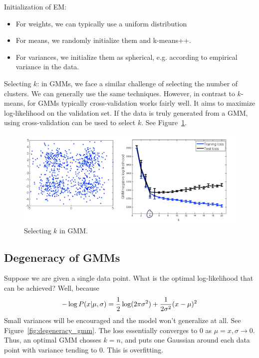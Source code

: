 \documentclass[a4paper,10pt,twoside]{article}
\begin{document}
Initialization of EM:
\begin{itemize}
\item For weights, we can typically use a uniform distribution
\item For means, we randomly initialize them and k-means++.
\item For variances, we initialize them as spherical, e.g. according to empirical variance in the data.
\end{itemize}

Selecting $k$: in GMMs, we face a similar challenge of selecting the number of clusters. We can generally use the same techniques. However, in contrast to $k$-means, for GMMs typically cross-validation works fairly well. It aims to maximize log-likelihood on the validation set. If the data is truly generated from a GMM, using cross-validation can be used to select $k$. See Figure~\ref{fig:selecting_k_gmm}.

\begin{figure}
  \centering
  \includegraphics[width=.8\textwidth]{figures/selecting_k_gmm.png}
  \caption{Selecting $k$ in GMM.}
  \label{fig:selecting_k_gmm}
\end{figure}

\subsection{Degeneracy of GMMs}

Suppose we are given a single data point. What is the optimal log-likelihood that can be achieved? Well, because
\begin{equation*}
  -\log P(x|\mu,\sigma)={1\over 2}\log(2\pi\sigma^2)+{1\over 2\sigma^2}(x-\mu)^2
\end{equation*}
Small variances will be encouraged and the model won't generalize at all. See Figure~\ref{fig:degeneracy_gmm}. The loss essentially converges to 0 as $\mu=x,\sigma\rightarrow 0$. Thus, an optimal GMM chosses $k=n$, and puts one Gaussian around each data point with variance tending to 0. This is overfitting.
\end{document}
